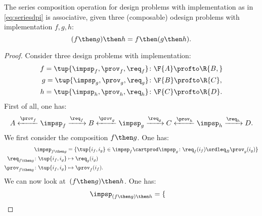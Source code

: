 {    \begin{lemma}
        The series composition operation for design problems with implementation as in \cref{eq:seriesdpi} is associative, \ie  given three (composable) odesign problems with implementation $f,g,h$:
        \begin{equation}
            (f\then g)
            \then h = f\then (g\then h).
        \end{equation}
    \end{lemma}
    \begin{proof}
        Consider three design problems with implementation:
        \begin{equation}
            \begin{aligned}
                f=\tup{{\impsp_f, \prov_f, \req_f} } & \colon \F{A} \profto\R{B,} \\
                g=\tup{\impsp_g, \prov_g, \req_g}    & \colon \F{B} \profto \R{C}, \\
                h=\tup{\impsp_h, \prov_h, \req_h}    & \colon \F{C} \profto \R{D}.
            \end{aligned}
        \end{equation}
        First of all, one has:
        \begin{equation}
            A \xleftarrow{\prov_f} \impsp_f \xrightarrow{\req_f} B
            \xleftarrow{\prov_g} \impsp_g \xrightarrow{\req_g} C
            \xleftarrow{\prov_h} \impsp_h \xrightarrow{\req_h} D.
        \end{equation}
        We first consider the composition $f\then g$.
        One has:
        \begin{equation}
            \begin{aligned}
                \impsp_{f\then g}                       & = \{
                \tup{i_f,i_g} \in \impsp_f \cartprod \impsp_g \colon
                \req_f(i_f) \ordleq_{B} \prov_g(i_g)
                \} \\
                \req_{f\then g}  \colon  \tup{i_f,i_g}  & \mapsto \req_g(i_g) \\
                \prov_{f\then g}  \colon  \tup{i_f,i_g} & \mapsto \prov_f(i_f).
            \end{aligned}
        \end{equation}
        We can now look at~$(f\then g)\then h$.
        One has:
        \begin{equation}
            \begin{aligned}
                 & \impsp_{(f\then g)\then h} = \{

\end{aligned}
\end{equation}
\end{proof}}
